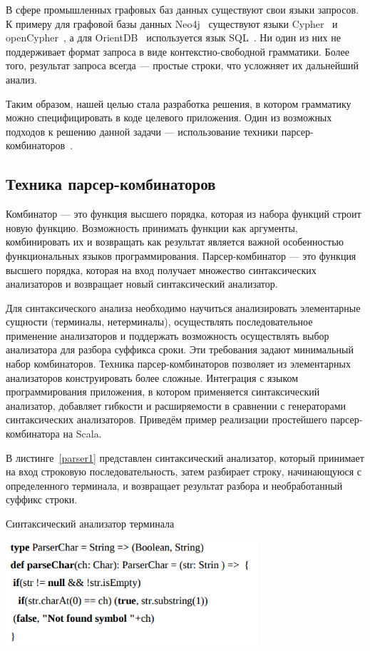 В сфере промышленных графовых баз данных существуют свои языки запросов. К примеру для графовой базы данных Neo4j~\cite{Neo4j} существуют языки Cypher~\cite{Cypher} и openCypher~\cite{openCypher}, а для OrientDB~\cite{OrientDB} используется язык SQL~\cite{Sql}. Ни один из них не поддерживает формат запроса в виде контекстно-свободной грамматики. Более того, результат запроса всегда --- простые строки, что усложняет их дальнейший анализ.

Таким образом, нашей целью стала разработка решения, в котором грамматику можно специфицировать в коде целевого приложения. Один из возможных подходов к решению данной задачи --- использование техники парсер-комбинаторов~\cite{HOFunParsing}.

\subsection{Техника парсер-комбинаторов}
Комбинатор --- это функция высшего порядка, которая из набора функций строит новую функцию. Возможность принимать функции как аргументы, комбинировать их и возвращать как результат является важной особенностью функциональных языков программирования. Парсер-комбинатор --- это функция высшего порядка, которая на вход получает множество синтаксических анализаторов и возвращает новый синтаксический анализатор. 

Для синтаксического анализа необходимо научиться анализировать элементарные сущности (терминалы, нетерминалы), осуществлять последовательное применение анализаторов и поддержать возможность осуществлять выбор анализатора для разбора суффикса сроки. Эти требования задают минимальный набор комбинаторов. Техника парсер-комбинаторов позволяет из элементарных анализаторов конструировать более сложные. Интеграция с языком программирования приложения, в котором применяется синтаксический анализатор, добавляет гибкости и расширяемости в сравнении с генераторами синтаксических анализаторов. Приведём пример реализации простейшего парсер-комбинатора на Scala.

В листинге~\ref{parser1} представлен синтаксический анализатор, который принимает на вход строковую последовательность, затем разбирает строку, начинающуюся с определенного терминала, и возвращает результат разбора и необработанный суффикс строки.

\begin{listing}
\caption{Синтаксический анализатор терминала}
\label{parser1}
\centering
\includegraphics[width=0.7\textwidth]{Smolina/pics/parser1.png}
\end{listing}

